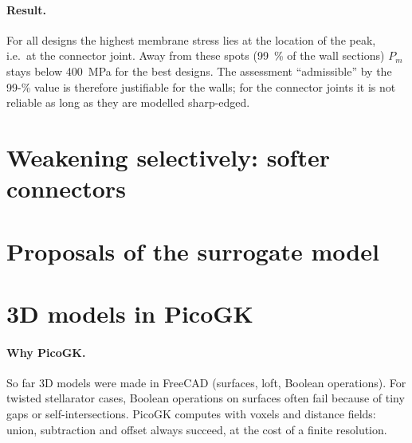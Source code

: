 \documentclass[10pt,a4paper]{article}
\begin{document}
\paragraph{Result.} For all designs the highest membrane stress lies at the location of the peak, i.e.\ at the connector
joint. Away from these spots (99~\% of the wall sections) $P_m$ stays below \SI{400}{MPa} for the best designs. The
assessment ``admissible'' by the 99-\% value is therefore justifiable for the walls; for the connector joints it is not
reliable as long as they are modelled sharp-edged.

\section{Weakening selectively: softer connectors}\label{sec:schwaechen}


\section{Proposals of the surrogate model}\label{sec:ersatz1}


\section{3D models in PicoGK}\label{sec:3d}
\paragraph{Why PicoGK.} So far 3D models were made in FreeCAD (surfaces, loft, Boolean operations). For twisted
stellarator cases, Boolean operations on surfaces often fail because of tiny gaps or self-intersections. PicoGK
\cite{picogk} computes with voxels and distance fields: union, subtraction and offset always succeed, at the cost of a
finite resolution.
\end{document}
